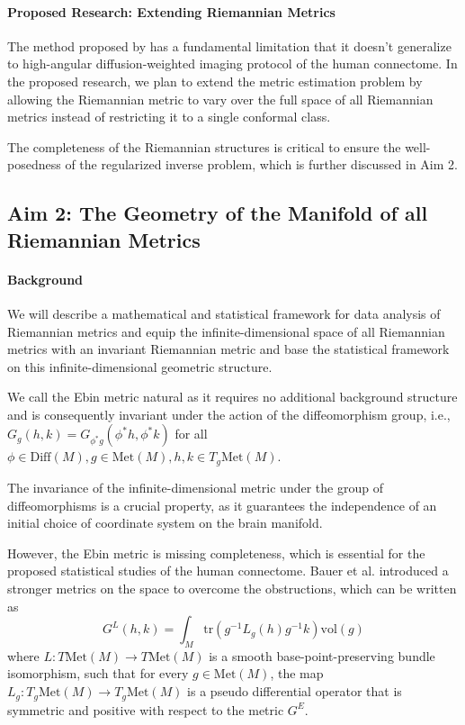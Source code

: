 \documentclass{article}
\theoremstyle{definition}
\theoremstyle{plain}
\begin{document}
\paragraph{Proposed Research: Extending Riemannian Metrics}The method proposed by \cite{hao} has a fundamental limitation that it doesn't generalize to high-angular diffusion-weighted imaging protocol of the human connectome. In the proposed research, we plan to extend the metric estimation problem by allowing the Riemannian metric to vary over the full space of all Riemannian metrics instead of restricting it to a single conformal class.

The completeness of the Riemannian structures is critical to ensure the well-posedness of the regularized inverse problem, which is further discussed in Aim 2.

\subsection{Aim 2: The Geometry of the Manifold of all Riemannian Metrics}
\paragraph{Background} We will describe a mathematical and statistical framework for data analysis of Riemannian metrics and equip the infinite-dimensional space of all Riemannian metrics with an invariant Riemannian metric and base the statistical framework on this infinite-dimensional geometric structure.

We call the Ebin metric natural as it requires no additional background structure and is consequently invariant under the action of the diffeomorphism group, i.e., $G_g(h,k)=G_{\phi^*g}(\phi^*h,\phi^*k)$ for all $\phi\in\mathrm{Diff}(M),g\in\mathrm{Met}(M),h,k\in T_g\mathrm{Met}(M)$.

The invariance of the infinite-dimensional metric under the group of diffeomorphisms is a crucial property, as it guarantees the independence of an initial choice of coordinate system on the brain manifold.

However, the Ebin metric is missing completeness, which is essential for the proposed statistical studies of the human connectome. Bauer et al. introduced a stronger metrics on the space to overcome the obstructions, which can be written as
\begin{equation*}
    G^L(h,k)=\int_M\mathrm{tr}(g^{-1}L_g(h)g^{-1}k)\mathrm{vol}(g)
\end{equation*}
where $L:T\mathrm{Met}(M)\rightarrow T\mathrm{Met}(M)$ is a smooth base-point-preserving bundle isomorphism, such that for every $g\in \mathrm{Met}(M)$, the map $L_g:T_g\mathrm{Met}(M)\rightarrow T_g\mathrm{Met}(M)$ is a pseudo differential operator that is symmetric and positive with respect to the metric $G^E$. 
\end{document}
